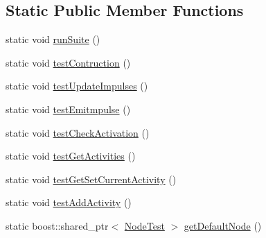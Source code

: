 \subsection*{Static Public Member Functions}
\begin{DoxyCompactItemize}
\item 
static void \hyperlink{classcryomesh_1_1components_1_1_node_test_a14815aa49eed66ddc12768b7a267fbf3}{runSuite} ()
\item 
static void \hyperlink{classcryomesh_1_1components_1_1_node_test_a79ace8c51f04945a39c6db6bfecb52ad}{testContruction} ()
\item 
static void \hyperlink{classcryomesh_1_1components_1_1_node_test_a9c197c71410083082c8c48a11fad82e6}{testUpdateImpulses} ()
\item 
static void \hyperlink{classcryomesh_1_1components_1_1_node_test_aa57dd18c6525fde65407b3960ae02c0e}{testEmitmpulse} ()
\item 
static void \hyperlink{classcryomesh_1_1components_1_1_node_test_adfc415707526e2056d4c7a353c6b7e22}{testCheckActivation} ()
\item 
static void \hyperlink{classcryomesh_1_1components_1_1_node_test_a7c80a62f615c92fe2f54aac2ade25e8d}{testGetActivities} ()
\item 
static void \hyperlink{classcryomesh_1_1components_1_1_node_test_a9dfc6c8d93b86aa225491831bdd670e1}{testGetSetCurrentActivity} ()
\item 
static void \hyperlink{classcryomesh_1_1components_1_1_node_test_a11df6ba93a83e8fec09c0a08d8f58d25}{testAddActivity} ()
\item 
static boost::shared\_\-ptr$<$ \hyperlink{classcryomesh_1_1components_1_1_node_test}{NodeTest} $>$ \hyperlink{classcryomesh_1_1components_1_1_node_test_addf21ba5c7b5c7632a94689de13a2d49}{getDefaultNode} ()
\end{DoxyCompactItemize}



